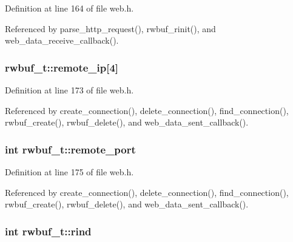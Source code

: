 Definition at line 164 of file web.\+h.



Referenced by parse\+\_\+http\+\_\+request(), rwbuf\+\_\+rinit(), and web\+\_\+data\+\_\+receive\+\_\+callback().

\subsubsection[{\texorpdfstring{remote\+\_\+ip}{remote_ip}}]{ rwbuf\+\_\+t\+::remote\+\_\+ip\mbox{[}4\mbox{]}}\hypertarget{structrwbuf__t_ad83926198e358ac1a569b0da7749572c}{}\label{structrwbuf__t_ad83926198e358ac1a569b0da7749572c}


Definition at line 173 of file web.\+h.



Referenced by create\+\_\+connection(), delete\+\_\+connection(), find\+\_\+connection(), rwbuf\+\_\+create(), rwbuf\+\_\+delete(), and web\+\_\+data\+\_\+sent\+\_\+callback().

\subsubsection[{\texorpdfstring{remote\+\_\+port}{remote_port}}]{\setlength{\rightskip}{0pt plus 5cm}int rwbuf\+\_\+t\+::remote\+\_\+port}\hypertarget{structrwbuf__t_aace1e79a985cc8fab4c2093208bf3763}{}\label{structrwbuf__t_aace1e79a985cc8fab4c2093208bf3763}


Definition at line 175 of file web.\+h.



Referenced by create\+\_\+connection(), delete\+\_\+connection(), find\+\_\+connection(), rwbuf\+\_\+create(), rwbuf\+\_\+delete(), and web\+\_\+data\+\_\+sent\+\_\+callback().

\subsubsection[{\texorpdfstring{rind}{rind}}]{\setlength{\rightskip}{0pt plus 5cm}int rwbuf\+\_\+t\+::rind}\hypertarget{structrwbuf__t_ad5cbf7a78a5f5d9aa75b38f90e0fb6af}{}\label{structrwbuf__t_ad5cbf7a78a5f5d9aa75b38f90e0fb6af}


